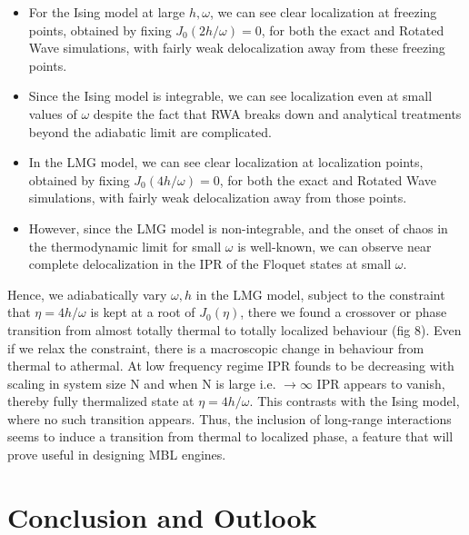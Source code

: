 \documentclass{article}
\begin{document}
\begin{itemize}

\item For the Ising model at large $h, \omega$, we can see clear localization at freezing points, obtained by fixing $J_0(2h/\omega)=0$,  for both the exact and Rotated Wave simulations, with fairly weak delocalization away from these freezing points. 

\item Since the Ising model is integrable, we can see localization even at small values of $\omega$ despite the fact that RWA breaks down and analytical treatments beyond the adiabatic limit are complicated.

\item In the LMG model, we can see clear localization at localization points, obtained by fixing $J_0(4h/\omega)=0$, for both the exact and Rotated Wave simulations, with fairly weak delocalization away from those points.

\item However, since the LMG model is non-integrable, and the onset of chaos in the thermodynamic limit for small $\omega$ is well-known, we can observe near complete delocalization in the IPR of the Floquet states at small $\omega$.
\end{itemize}

Hence, we adiabatically vary $\omega, h$ in the LMG model, subject to the constraint that $\eta=4h/\omega$ is kept at a root of $J_0(\eta)$, there we found a crossover or phase transition from almost totally thermal to totally localized behaviour (fig 8). Even if we relax the constraint, there is a macroscopic change in behaviour from thermal to athermal. At low frequency regime IPR founds to be decreasing with scaling in system size N and when N is large i.e. $\rightarrow{}\infty$ IPR appears to vanish, thereby fully thermalized state at $\eta=4h/\omega$.  This contrasts with the Ising model, where no such transition appears. Thus, the inclusion of long-range interactions seems to induce a transition from thermal to localized phase, a feature that will prove useful in designing MBL engines.

\section{Conclusion and Outlook}
\end{document}
